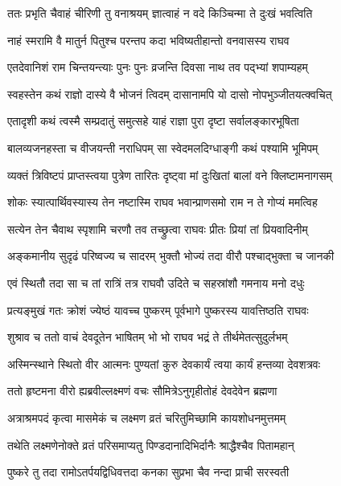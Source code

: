 \twolineshloka
{ततः प्रभृति चैवाहं चीरिणी तु वनाश्रयम्}
{ज्ञात्वाहं न वदे किञ्चिन्मा ते दुःखं भवत्विति} %

\twolineshloka
{नाहं स्मरामि वै मातुर्न पितुश्च परन्तप}
{कदा भविष्यतीहान्तो वनवासस्य राघव} %

\twolineshloka
{एतदेवानिशं राम चिन्तयन्त्याः पुनः पुनः}
{व्रजन्ति दिवसा नाथ तव पद्भ्यां शपाम्यहम्} %

\twolineshloka
{स्वहस्तेन कथं राज्ञो दास्ये वै भोजनं त्विदम्}
{दासानामपि यो दासो नोपभुञ्जीतयत्क्वचित्} %

\twolineshloka
{एतादृशी कथं त्वस्मै सम्प्रदातुं समुत्सहे}
{याहं राज्ञा पुरा दृष्टा सर्वालङ्कारभूषिता} %

\twolineshloka
{बालव्यजनहस्ता च वीजयन्ती नराधिपम्}
{सा स्वेदमलदिग्धाङ्गी कथं पश्यामि भूमिपम्} %

\twolineshloka
{व्यक्तं त्रिविष्टपं प्राप्तस्त्वया पुत्रेण तारितः}
{दृष्ट्वा मां दुःखितां बालां वने क्लिष्टामनागसम्} %

\twolineshloka
{शोकः स्यात्पार्थिवस्यास्य तेन नष्टास्मि राघव}
{भवान्प्राणसमो राम न ते गोप्यं ममत्विह} %

\twolineshloka
{सत्येन तेन चैवाथ स्पृशामि चरणौ तव}
{तच्छ्रुत्वा राघवः प्रीतः प्रियां तां प्रियवादिनीम्} %

\twolineshloka
{अङ्कमानीय सुदृढं परिष्वज्य च सादरम्}
{भुक्तौ भोज्यं तदा वीरौ पश्चाद्भुक्ता च जानकी} %

\twolineshloka
{एवं स्थितौ तदा सा च तां रात्रिं तत्र राघवौ}
{उदिते च सहस्रांशौ गमनाय मनो दधुः} %

\twolineshloka
{प्रत्यङ्मुखं गतः क्रोशं ज्येष्ठं यावच्च पुष्करम्}
{पूर्वभागे पुष्करस्य यावत्तिष्ठति राघवः} %

\twolineshloka
{शुश्राव च ततो वाचं देवदूतेन भाषितम्}
{भो भो राघव भद्रं ते तीर्थमेतत्सुदुर्लभम्} %

\twolineshloka
{अस्मिन्स्थाने स्थितो वीर आत्मनः पुण्यतां कुरु}
{देवकार्यं त्वया कार्यं हन्तव्या देवशत्रवः} %

\twolineshloka
{ततो हृष्टमना वीरो ह्यब्रवील्लक्ष्मणं वचः}
{सौमित्रेऽनुगृहीतोहं देवदेवेन ब्रह्मणा} %

\twolineshloka
{अत्राश्रमपदं कृत्वा मासमेकं च लक्ष्मण}
{व्रतं चरितुमिच्छामि कायशोधनमुत्तमम्} %

\twolineshloka
{तथेति लक्ष्मणेनोक्ते व्रतं परिसमाप्यतु}
{पिण्डदानादिभिर्दानैः श्राद्धैश्चैव पितामहान्} %

\twolineshloka
{पुष्करे तु तदा रामोऽतर्पयद्विधिवत्तदा}
{कनका सुप्रभा चैव नन्दा प्राची सरस्वती} %

